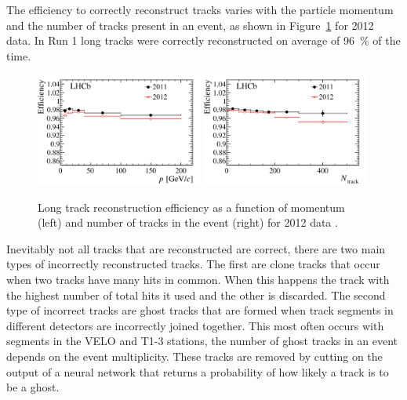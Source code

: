 The efficiency to correctly reconstruct tracks varies with the particle momentum and the number of tracks present in an event, as shown in Figure~\ref{fig:types_of_tracks} for 2012 data. In Run 1 long tracks were correctly reconstructed on average of 96~$\%$ of the time.





\begin{figure}[tb] 
  \centering    
  \includegraphics[width=0.49\textwidth]{./Figs/LHC_LHCb/hidef_Fig16topleft.png}
  \includegraphics[width=0.49\textwidth]{./Figs/LHC_LHCb/hidef_Fig16bottomleft.png}
  \caption{Long track reconstruction efficiency as a function of momentum (left) and number of tracks in the event (right) for 2012 data \cite{Aaij:2014pwa}.}
  \label{fig:types_of_tracks}
\end{figure}




Inevitably not all tracks that are reconstructed are correct, there are two main types of incorrectly reconstructed tracks. The first are clone tracks that occur when two tracks have many hits in common. When this happens the track with the highest number of total hits it used and the other is discarded. The second type of incorrect tracks are ghost tracks that are formed when track segments in different detectors are incorrectly joined together. This most often occurs with segments in the VELO and T1-3 stations, the number of ghost tracks in an event depends on the event multiplicity. These tracks are removed by cutting on the output of a neural network that returns a probability of how likely a track is to be a ghost.



